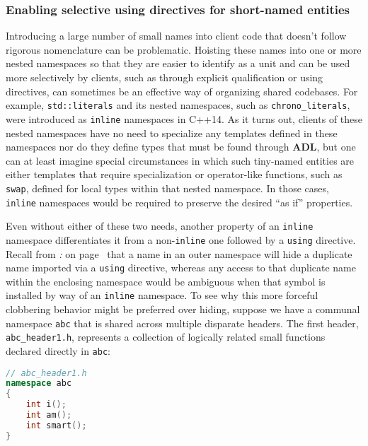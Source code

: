 \subsubsection[Enabling selective {\tt using} directives for short-named entities]{Enabling selective {\SubsubsecCode using} directives for short-named entities}\label{enabling-selective-using-directives-for-short-named-entities}

Introducing a large number of small names into client code that doesn't
follow rigorous nomenclature can be problematic. Hoisting these names
into one or more nested namespaces so that they are easier to identify
as a unit and can be used more selectively by clients, such as through
explicit qualification or using directives, can sometimes be an
effective way of organizing shared codebases. For example,
\texttt{std::literals} and its nested namespaces, such as
\texttt{chrono\_literals}, were introduced as \texttt{inline} namespaces
in C++14. As it turns out, clients of these nested namespaces have no
need to specialize any templates defined in these namespaces nor do they
define types that must be found through \textbf{ADL}, but one can at
least imagine special circumstances in which such tiny-named entities
are either templates that require specialization or operator-like
functions, such as \texttt{swap}, defined for local types within that
nested namespace. In those cases, \texttt{inline} namespaces would be
required to preserve the desired ``as if'' properties.

Even without either of these two needs, another property of an
\texttt{inline} namespace differentiates it from a non-\texttt{inline}
one followed by a \texttt{using} directive. Recall from
\textit{: } on page~\pageref{loss-of-access-to-duplicate-names-in-enclosing-namespace} that a name in an outer namespace will
hide a duplicate name imported via a \texttt{using} directive, whereas
any access to that duplicate name within the enclosing namespace would
be ambiguous when that symbol is installed by way of an \texttt{inline}
namespace. To see why this more forceful clobbering behavior might be
preferred over hiding, suppose we have a communal namespace \texttt{abc}
that is shared across multiple disparate headers. The first header,
\texttt{abc\_header1.h}, represents a collection of logically related
small functions declared directly in \texttt{abc}:

\begin{lstlisting}[language=C++]
// abc_header1.h
namespace abc
{
    int i();
    int am();
    int smart();
}
\end{lstlisting}

